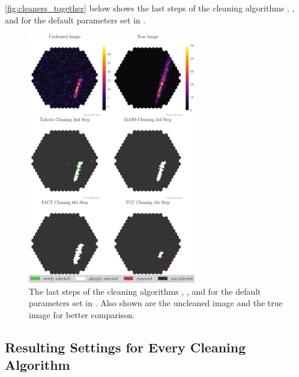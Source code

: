 \autoref{fig:cleaners_together} below shows the last steps of the cleaning algorithms \tailcuts{}, \mars{}, \fact{} and \tcc{}
for the default parameters set in \ctapipe{}.

\begin{figure}
    \centering
    \includegraphics[width=0.65\textwidth]{plots/cleaner_steps/last_steps.pdf}
    \caption{The last steps of the cleaning algorithms \tailcuts{}, \mars{}, \fact{} and \tcc{} for the default
    parameters set in \ctapipe{}. Also shown are the uncleaned image and the true image for better comparison.}
    \label{fig:cleaners_together}
\end{figure}


\subsection{Resulting Settings for Every Cleaning Algorithm}
\label{ap:cleaning_settings_all}

